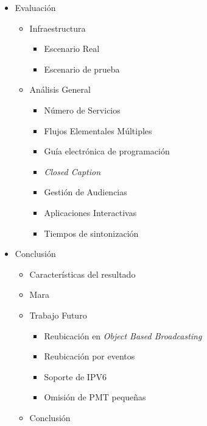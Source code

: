 \documentclass[a4paper,11pt]{beamer}
\begin{document}
\begin{frame}
\begin{center}
\begin{itemize}
\item Evaluación
	\begin{itemize}
		\item Infraestructura
			\begin{itemize}
				\item Escenario Real
				\item Escenario de prueba
			\end{itemize}
		\item Análisis General
			\begin{itemize}
				\item Número de Servicios
				\item Flujos Elementales Múltiples
				\item Guía electrónica de programación
				\item \emph{Closed Caption}
				\item Gestión de Audiencias
				\item Aplicaciones Interactivas
				\item Tiempos de sintonización
			\end{itemize}
	\end{itemize}
\item Conclusión
	\begin{itemize}
		\item Características del resultado
		\item Mara
		\item Trabajo Futuro
		\begin{itemize}
			\item Reubicación en \emph{Object Based Broadcasting}
			\item Reubicación por eventos
			\item Soporte de IPV6
			\item Omisión de PMT pequeñas
		\end{itemize}
		\item Conclusión
	\end{itemize}
\end{itemize}

\end{center}
\end{frame}


\end{document}
